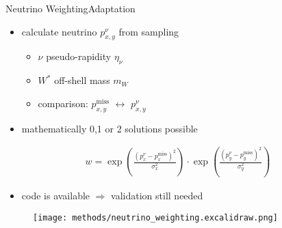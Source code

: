 \documentclass[9pt, aspectratio=169]{beamer}
\begin{document}
\begin{frame}{Neutrino Weighting}{Adaptation}
	\begin{minipage}{.60\textwidth}
		\begin{itemize}
			\item calculate neutrino $p_{x,y}^\nu$ from sampling
			\begin{itemize}
				\item $\nu$ pseudo-rapidity $\eta_\nu$
				\item $W^*$ off-shell mass $m_W$
				\item comparison: $p_{x,y}^\text{miss}$ $\leftrightarrow$ $p_{x,y}^\nu$
			\end{itemize}	
			\item mathematically 0,1 or 2 solutions possible
		\end{itemize}

		\begin{align*}
			w = \exp\left(\frac{(p_x^\nu-p_x^\text{miss})^2}{\sigma_x^2}\right) \cdot \exp\left(\frac{(p_y^\nu-p_y^\text{miss})^2}{\sigma_y^2}\right)
		\end{align*}

		\begin{itemize}
			\item code is available $\Rightarrow$ validation still needed
		\end{itemize}
	\end{minipage}\hfill
	\begin{minipage}{.38\textwidth}
		\begin{figure}
			\centering
			\texttt{[image: methods/neutrino\_weighting.excalidraw.png]}
		\end{figure}
	\end{minipage}
\end{frame}
\end{document}
